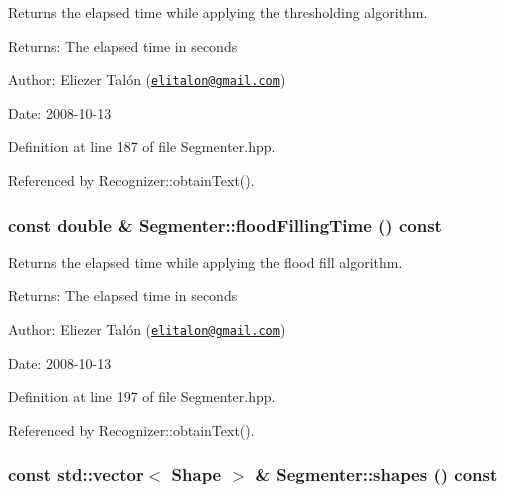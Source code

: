 Returns the elapsed time while applying the thresholding algorithm. 

\begin{Desc}
\item[Returns:]The elapsed time in seconds\end{Desc}
\begin{Desc}
\item[Author:]Eliezer Talón (\href{mailto:elitalon@gmail.com}{\tt elitalon@gmail.com}) \end{Desc}
\begin{Desc}
\item[Date:]2008-10-13 \end{Desc}


Definition at line 187 of file Segmenter.hpp.

Referenced by Recognizer::obtainText().\hypertarget{class_segmenter_e7c93cb16e314baeb713bbd6ca9b667b}{
\subsubsection[floodFillingTime]{\setlength{\rightskip}{0pt plus 5cm}const double \& Segmenter::floodFillingTime () const}}
\label{class_segmenter_e7c93cb16e314baeb713bbd6ca9b667b}


Returns the elapsed time while applying the flood fill algorithm. 

\begin{Desc}
\item[Returns:]The elapsed time in seconds\end{Desc}
\begin{Desc}
\item[Author:]Eliezer Talón (\href{mailto:elitalon@gmail.com}{\tt elitalon@gmail.com}) \end{Desc}
\begin{Desc}
\item[Date:]2008-10-13 \end{Desc}


Definition at line 197 of file Segmenter.hpp.

Referenced by Recognizer::obtainText().\hypertarget{class_segmenter_f2dd7f34c8b0f902323005335e41bd57}{
\subsubsection[shapes]{\setlength{\rightskip}{0pt plus 5cm}const std::vector$<$ {\bf Shape} $>$ \& Segmenter::shapes () const}}
\label{class_segmenter_f2dd7f34c8b0f902323005335e41bd57}


